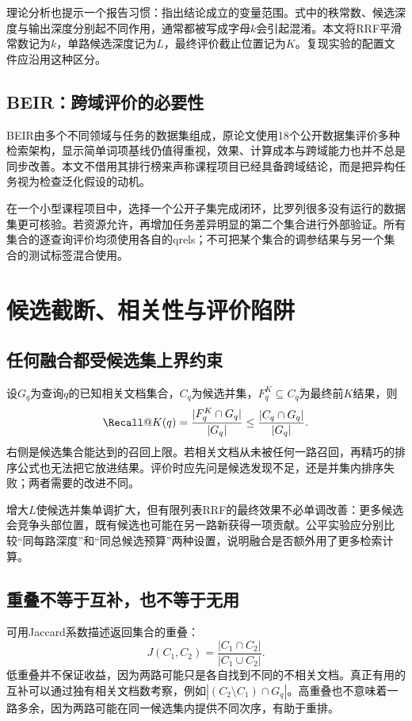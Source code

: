 \documentclass[sigconf,nonacm]{acmart}
\begin{document}
理论分析也提示一个报告习惯：指出结论成立的变量范围。式中的秩常数、候选深度与输出深度分别起不同作用，通常都被写成字母$k$会引起混淆。本文将RRF平滑常数记为$k$，单路候选深度记为$L$，最终评价截止位置记为$K$。复现实验的配置文件应沿用这种区分。

\subsection{BEIR：跨域评价的必要性}
BEIR由多个不同领域与任务的数据集组成，原论文使用18个公开数据集评价多种检索架构，显示简单词项基线仍值得重视，效果、计算成本与跨域能力也并不总是同步改善\cite{thakur2021beir}。本文不借用其排行榜来声称课程项目已经具备跨域结论，而是把异构任务视为检查泛化假设的动机。

在一个小型课程项目中，选择一个公开子集完成闭环，比罗列很多没有运行的数据集更可核验。若资源允许，再增加任务差异明显的第二个集合进行外部验证。所有集合的逐查询评价均须使用各自的qrels；不可把某个集合的调参结果与另一个集合的测试标签混合使用。

\section{候选截断、相关性与评价陷阱}
\subsection{任何融合都受候选集上界约束}
设$G_q$为查询$q$的已知相关文档集合，$C_q$为候选并集，$F_q^K\subseteq C_q$为最终前$K$结果，则
\begin{equation}
 \Recall@K(q)=\frac{|F_q^K\cap G_q|}{|G_q|}
 \leq\frac{|C_q\cap G_q|}{|G_q|}.
\end{equation}
右侧是候选集合能达到的召回上限。若相关文档从未被任何一路召回，再精巧的排序公式也无法把它放进结果。评价时应先问是候选发现不足，还是并集内排序失败；两者需要的改进不同。

增大$L$使候选并集单调扩大，但有限列表RRF的最终效果不必单调改善：更多候选会竞争头部位置，既有候选也可能在另一路新获得一项贡献。公平实验应分别比较“同每路深度”和“同总候选预算”两种设置，说明融合是否额外用了更多检索计算。

\subsection{重叠不等于互补，也不等于无用}
可用Jaccard系数描述返回集合的重叠：
\begin{equation}
 J(C_1,C_2)=\frac{|C_1\cap C_2|}{|C_1\cup C_2|}.
\end{equation}
低重叠并不保证收益，因为两路可能只是各自找到不同的不相关文档。真正有用的互补可以通过独有相关文档数考察，例如$|(C_2\setminus C_1)\cap G_q|$。高重叠也不意味着一路多余，因为两路可能在同一候选集内提供不同次序，有助于重排。
\end{document}
